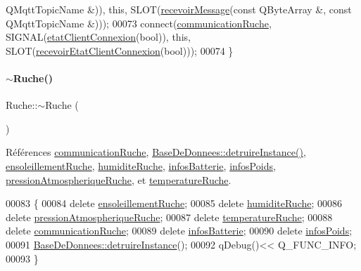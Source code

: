 \begin{DoxyCode}
      QMqttTopicName &)), \textcolor{keyword}{this}, SLOT(\hyperlink{class_ruche_a05a34e78d360609f772b9a37c69d0043}{recevoirMessage}(\textcolor{keyword}{const} QByteArray &, \textcolor{keyword}{const} QMqttTopicName &)));
00073     connect(\hyperlink{class_ruche_a6211b7b8f43abf5eecf8a1fc2d0f037e}{communicationRuche}, SIGNAL(\hyperlink{class_ruche_a932b2c69dbe919afed9549d5666b2736}{etatClientConnexion}(\textcolor{keywordtype}{bool})), \textcolor{keyword}{
      this}, SLOT(\hyperlink{class_ruche_a1224416341dc2b33418dd296327ae410}{recevoirEtatClientConnexion}(\textcolor{keywordtype}{bool})));
00074 \}
\end{DoxyCode}
\mbox{\label{class_ruche_ad3f950d0731f9801f06dd6ae09f2e5fa}} 
\paragraph{\texorpdfstring{$\sim$\+Ruche()}{~Ruche()}}
{\footnotesize\ttfamily Ruche\+::$\sim$\+Ruche (\begin{DoxyParamCaption}{ }\end{DoxyParamCaption})}



Références \hyperlink{class_ruche_a6211b7b8f43abf5eecf8a1fc2d0f037e}{communication\+Ruche}, \hyperlink{class_base_de_donnees_a457401c0816b888c77ce915997545f4e}{Base\+De\+Donnees\+::detruire\+Instance()}, \hyperlink{class_ruche_a197003ecff4f029885c7d38569a68d49}{ensoleillement\+Ruche}, \hyperlink{class_ruche_acb380928928e693a1933c4cf607ddf80}{humidite\+Ruche}, \hyperlink{class_ruche_af34340e456aff54c8d1ec433fdbe0740}{infos\+Batterie}, \hyperlink{class_ruche_af3d02b62dd3d986b73b38851bb88ec77}{infos\+Poids}, \hyperlink{class_ruche_a06efa82900dc7e31ed67c826d3157ae0}{pression\+Atmospherique\+Ruche}, et \hyperlink{class_ruche_af721fb92f801a9b1f3ef3aa9867cf3de}{temperature\+Ruche}.


\begin{DoxyCode}
00083 \{
00084     \textcolor{keyword}{delete} \hyperlink{class_ruche_a197003ecff4f029885c7d38569a68d49}{ensoleillementRuche};
00085     \textcolor{keyword}{delete} \hyperlink{class_ruche_acb380928928e693a1933c4cf607ddf80}{humiditeRuche};
00086     \textcolor{keyword}{delete} \hyperlink{class_ruche_a06efa82900dc7e31ed67c826d3157ae0}{pressionAtmospheriqueRuche};
00087     \textcolor{keyword}{delete} \hyperlink{class_ruche_af721fb92f801a9b1f3ef3aa9867cf3de}{temperatureRuche};
00088     \textcolor{keyword}{delete} \hyperlink{class_ruche_a6211b7b8f43abf5eecf8a1fc2d0f037e}{communicationRuche};
00089     \textcolor{keyword}{delete} \hyperlink{class_ruche_af34340e456aff54c8d1ec433fdbe0740}{infosBatterie};
00090     \textcolor{keyword}{delete} \hyperlink{class_ruche_af3d02b62dd3d986b73b38851bb88ec77}{infosPoids};
00091     \hyperlink{class_base_de_donnees_a457401c0816b888c77ce915997545f4e}{BaseDeDonnees::detruireInstance}();
00092     qDebug()<< Q\_FUNC\_INFO;
00093 \}
\end{DoxyCode}


